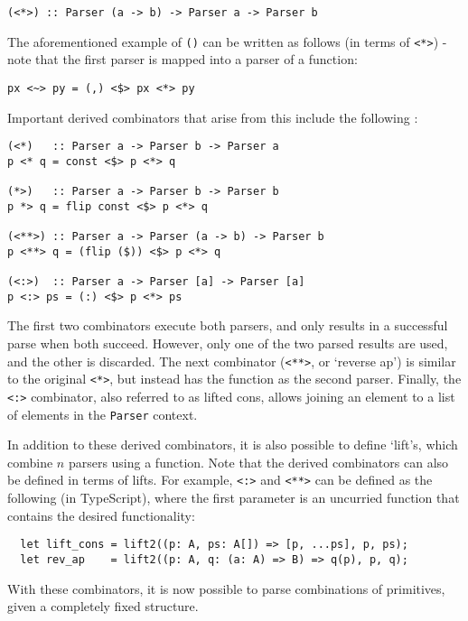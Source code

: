\begin{verbatim}
(<*>) :: Parser (a -> b) -> Parser a -> Parser b
\end{verbatim}

The aforementioned example of \texttt{(\mult)} can be written as follows (in terms of \texttt{<*>}) - note that the first parser is mapped into a parser of a function:

\begin{verbatim}
px <~> py = (,) <$> px <*> py
\end{verbatim}

Important derived combinators that arise from this include the following \cite{yoda}:

\begin{verbatim}
(<*)   :: Parser a -> Parser b -> Parser a
p <* q = const <$> p <*> q

(*>)   :: Parser a -> Parser b -> Parser b
p *> q = flip const <$> p <*> q

(<**>) :: Parser a -> Parser (a -> b) -> Parser b
p <**> q = (flip ($)) <$> p <*> q

(<:>)  :: Parser a -> Parser [a] -> Parser [a]
p <:> ps = (:) <$> p <*> ps
\end{verbatim}

The first two combinators execute both parsers, and only results in a successful parse when both succeed.
However, only one of the two parsed results are used, and the other is discarded.
The next combinator (\texttt{<**>}, or `reverse ap') is similar to the original \texttt{<*>}, but instead has the function as the second parser.
Finally, the \texttt{<:>} combinator, also referred to as lifted cons, allows joining an element to a list of elements in the \texttt{Parser} context.

In addition to these derived combinators, it is also possible to define `lift's, which combine $n$ parsers using a function.
Note that the derived combinators can also be defined in terms of lifts.
For example, \texttt{<:>} and \texttt{<**>} can be defined as the following (in TypeScript), where the first parameter is an uncurried function that contains the desired functionality:

\begin{verbatim}
  let lift_cons = lift2((p: A, ps: A[]) => [p, ...ps], p, ps);
  let rev_ap    = lift2((p: A, q: (a: A) => B) => q(p), p, q);
\end{verbatim}

With these combinators, it is now possible to parse combinations of primitives, given a completely fixed structure.

